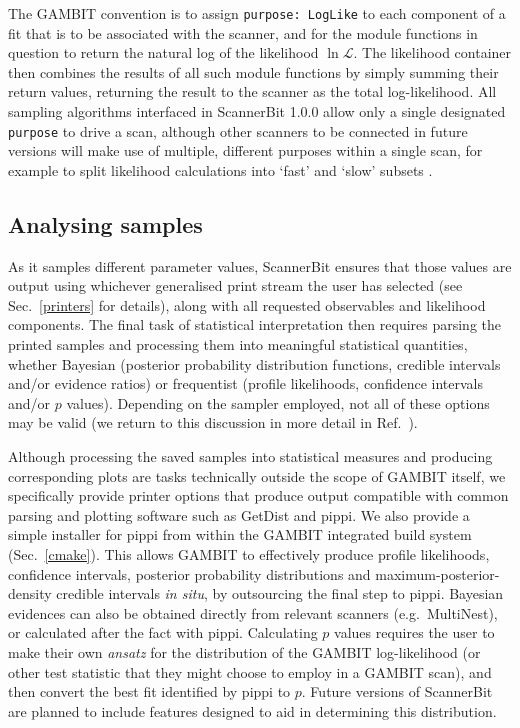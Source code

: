 \documentclass[pdftex,twocolumn,epjc3_preprint,runningheads]{svjour3}
\renewcommand{\_}{\discretionary{\underscore}{}{\underscore}}
\newcommand\yaml[1]{{\lstset{style=yaml}\lstinline!#1!\lstset{style=cpp}}}
\newcommand{\gambit}{\textsf{GAMBIT}\xspace}
\newcommand{\scannerbit}{\textsf{ScannerBit}\xspace}
\newcommand{\GB}{\gambit}
\newcommand\pippi{\textsf{pippi}\xspace}
\newcommand\MultiNest{\textsf{MultiNest}\xspace}
\newcommand\multinest{\MultiNest}
\begin{document}
The \GB convention is to assign \yaml{purpose: LogLike} to each component of a fit that is to be associated with the scanner, and for the module functions in question to return the natural log of the likelihood $\ln\mathcal{L}$.  The likelihood container then combines the results of all such module functions by simply summing their return values, returning the result to the scanner as the total log-likelihood.  All sampling algorithms interfaced in \textsf{ScannerBit 1.0.0} allow only a single designated \yaml{purpose} to drive a scan, although other scanners to be connected in future versions will make use of multiple, different purposes within a single scan, for example to split likelihood calculations into `fast' and `slow' subsets \cite{Lewis_slowfast}.

\subsection{Analysing samples}
\label{stats:results}

As it samples different parameter values, \scannerbit ensures that those values are output using whichever generalised print stream the user has selected (see Sec.\ \ref{printers} for details), along with all requested observables and likelihood components.  The final task of statistical interpretation then requires parsing the printed samples and processing them into meaningful statistical quantities, whether Bayesian (posterior probability distribution functions, credible intervals and/or evidence ratios) or frequentist (profile likelihoods, confidence intervals and/or $p$ values).  Depending on the sampler employed, not all of these options may be valid (we return to this discussion in more detail in Ref.\ \cite{ScannerBit}).

Although processing the saved samples into statistical measures and producing corresponding plots are tasks technically outside the scope of \GB itself, we specifically provide printer options that produce output compatible with common parsing and plotting software such as \textsf{GetDist} \cite{CosmoMC} and \pippi \cite{pippi}.  We also provide a simple installer for \pippi from within the \GB integrated build system (Sec.\ \ref{cmake}). This allows \GB to effectively produce profile likelihoods, confidence intervals, posterior probability distributions and maximum-posterior-density credible intervals \textit{in situ}, by outsourcing the final step to \pippi.  Bayesian evidences can also be obtained directly from relevant scanners (e.g.\ \multinest), or calculated after the fact with \pippi.  Calculating $p$ values requires the user to make their own \textit{ansatz} for the distribution of the \GB log-likelihood (or other test statistic that they might choose to employ in a \GB scan), and then convert the best fit identified by \pippi to $p$.  Future versions of \scannerbit are planned to include features designed to aid in determining this distribution.
\end{document}
